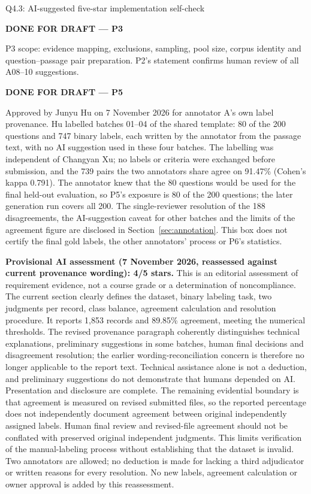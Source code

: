 \begin{review}{Q4.3: AI-suggested five-star implementation self-check}
\colorbox{yellow!45}{\strut\textbf{DONE FOR DRAFT --- P3}}\par
P3 scope: evidence mapping, exclusions, sampling, pool size, corpus identity and question--passage pair preparation. P2's statement confirms human review of all A08--10 suggestions.\par\smallskip
\colorbox{yellow!45}{\strut\textbf{DONE FOR DRAFT --- P5}}\par
Approved by Junyu Hu on 7 November 2026 for annotator A's own label provenance. Hu labelled batches 01--04 of the shared template: 80 of the 200 questions and 747 binary labels, each written by the annotator from the passage text, with no AI suggestion used in these four batches. The labelling was independent of Changyan Xu; no labels or criteria were exchanged before submission, and the 739 pairs the two annotators share agree on 91.47\% (Cohen's kappa 0.791). The annotator knew that the 80 questions would be used for the final held-out evaluation, so P5's exposure is 80 of the 200 questions; the later generation run covers all 200. The single-reviewer resolution of the 188 disagreements, the AI-suggestion caveat for other batches and the limits of the agreement figure are disclosed in Section~\ref{sec:annotation}. This box does not certify the final gold labels, the other annotators' process or P6's statistics.\par\smallskip
{}\quad\textbf{Provisional AI assessment (7 November 2026, reassessed against current provenance wording): 4/5 stars.} This is an editorial assessment of requirement evidence, not a course grade or a determination of noncompliance. The current section clearly defines the dataset, binary labeling task, two judgments per record, class balance, agreement calculation and resolution procedure. It reports 1,853 records and 89.85\% agreement, meeting the numerical thresholds. The revised provenance paragraph coherently distinguishes technical explanations, preliminary suggestions in some batches, human final decisions and disagreement resolution; the earlier wording-reconciliation concern is therefore no longer applicable to the report text. Technical assistance alone is not a deduction, and preliminary suggestions do not demonstrate that humans depended on AI. Presentation and disclosure are complete. The remaining evidential boundary is that agreement is measured on revised submitted files, so the reported percentage does not independently document agreement between original independently assigned labels. Human final review and revised-file agreement should not be conflated with preserved original independent judgments. This limits verification of the manual-labeling process without establishing that the dataset is invalid. Two annotators are allowed; no deduction is made for lacking a third adjudicator or written reasons for every resolution. No new labels, agreement calculation or owner approval is added by this reassessment.
\end{review}
